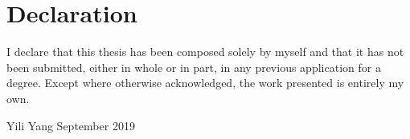 \chapter{Declaration}
\vspace*{2\baselineskip}
I declare that this thesis has been composed 
solely by myself and that it has not been submitted, either in whole or
in part, in any previous application for a degree.
Except where otherwise acknowledged, the work presented is entirely my
own.
\vspace{6\baselineskip}\\
\begin{flushright}
\hspace*{\fill}
Yili Yang
\newline
September 2019
\end{flushright}


\cleardoublepage
